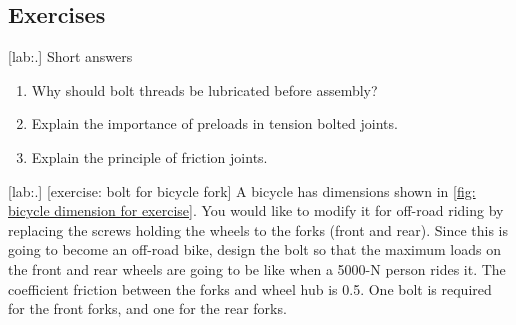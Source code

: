\documentclass[a4paper,openany,nobib]{tufte-book}
\begin{document}
{{\subsection{Exercises}
\label{exercises-7}
[lab:.] Short answers

\begin{enumerate}
\item Why should bolt threads be lubricated before assembly?

\item Explain the importance of preloads in tension bolted joints.

\item Explain the principle of friction joints.
\end{enumerate}

[lab:.]
[exercise: bolt for bicycle fork] A bicycle has dimensions shown in
\ref{fig: bicycle dimension for exercise}.
You would like to modify it for off-road riding by replacing the screws
holding the wheels to the forks (front and rear). Since this is going to
become an off-road bike, design the bolt so that the maximum loads on
the front and rear wheels are going to be like when a 5000-N person
rides it. The coefficient friction between the forks and wheel hub is
0.5. One bolt is required for the front forks, and one for the rear
forks.


}}
\end{document}
